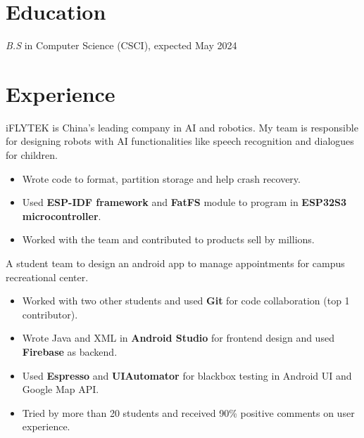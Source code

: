 \documentclass{resume}
\begin{document}



\section{Education}
\textit{B.S} in Computer Science (CSCI), expected May 2024

\section{Experience}
  iFLYTEK is China's leading company in AI and robotics. My team is responsible for designing robots with AI functionalities like speech recognition and dialogues for children.
\begin{itemize}
  \item Wrote code to format, partition storage and help crash recovery.
  \item Used \textbf{ESP-IDF framework} and \textbf{FatFS} module to program in \textbf{ESP32S3 microcontroller}.
  \item Worked with the team and contributed to products sell by millions.
\end{itemize}

  A student team to design an android app to manage appointments for campus recreational center.
\begin{itemize}
  \item Worked with two other students and used \textbf{Git} for code collaboration (top 1 contributor).
  \item Wrote Java and XML in \textbf{Android Studio} for frontend design and used \textbf{Firebase} as backend.
  \item Used \textbf{Espresso} and \textbf{UIAutomator} for blackbox testing in Android UI and Google Map API.
  \item Tried by more than 20 students and received 90\% positive comments on user experience.
\end{itemize}
\end{document}
